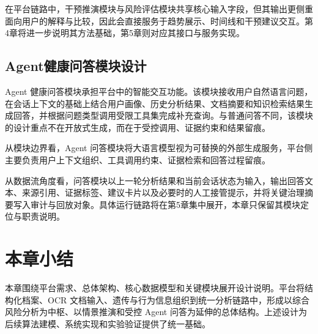 在平台链路中，干预推演模块与风险评估模块共享核心输入字段，但其输出更侧重面向用户的解释与比较，因此会直接服务于趋势展示、时间线和干预建议交互。第4章将进一步说明其方法基础，第5章则对应其接口与服务实现。

\subsection{Agent健康问答模块设计}

Agent 健康问答模块承担平台中的智能交互功能。该模块接收用户自然语言问题，在会话上下文的基础上结合用户画像、历史分析结果、文档摘要和知识检索结果生成回答，并根据问题类型调用受限工具集完成补充查询。与普通问答不同，该模块的设计重点不在开放式生成，而在于受控调用、证据约束和结果留痕。

从模块边界看，Agent 问答模块将大语言模型视为可替换的外部生成服务，平台侧主要负责用户上下文组织、工具调用约束、证据检索和回答过程留痕。

从数据流角度看，问答模块以上一轮分析结果和当前会话状态为输入，输出回答文本、来源引用、证据标签、建议卡片以及必要时的人工接管提示，并将关键治理摘要写入审计与回放对象。具体运行链路将在第5章集中展开，本章只保留其模块定位与职责说明。

\section{本章小结}

本章围绕平台需求、总体架构、核心数据模型和关键模块展开设计说明。平台将结构化档案、OCR 文档输入、遗传与行为信息组织到统一分析链路中，形成以综合风险分析为中枢、以情景推演和受控 Agent 问答为延伸的总体结构。上述设计为后续算法建模、系统实现和实验验证提供了统一基础。
